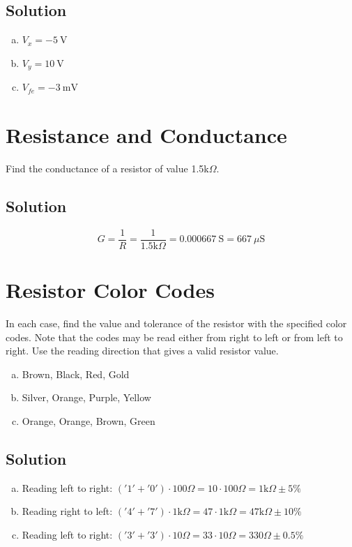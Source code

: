\documentclass{article}
\begin{document}
\subsection*{Solution}
\begin{enumerate}[(a)]
\item $V_x = -5 \ \textrm{V}$
\item $V_y = 10 \ \textrm{V}$
\item $V_{fe} = -3 \ \textrm{mV}$
\end{enumerate}

\section{Resistance and Conductance}
Find the conductance of a resistor of value 1.5k$\Omega$.
\subsection*{Solution}
$$G = \frac{1}{R} = \frac{1}{1.5\textrm{k}\Omega} = 0.000667 \ \textrm{S} = 667 \ \mu\textrm{S}$$

\section{Resistor Color Codes}
In each case, find the value and tolerance of the resistor with the specified color codes. Note that the codes may be read either from right to left or from left to right. Use the reading direction that gives a valid resistor value.
\begin{enumerate}[(a)]
\item Brown, Black, Red, Gold
\item Silver, Orange, Purple, Yellow
\item Orange, Orange, Brown, Green
\end{enumerate}

\subsection*{Solution}
\begin{enumerate}[(a)]
\item Reading left to right: $('1' + '0') \cdot 100\Omega = 10\cdot100\Omega = 1\textrm{k}\Omega \pm 5\%$
\item Reading right to left: $('4' + '7') \cdot 1\textrm{k}\Omega = 47\cdot1\textrm{k}\Omega = 47\textrm{k}\Omega \pm 10\%$
\item Reading left to right: $('3' + '3') \cdot 10\Omega = 33\cdot10\Omega = 330\Omega \pm 0.5\%$
\end{enumerate}
\end{document}
